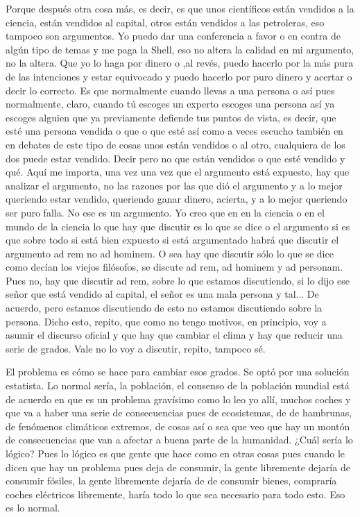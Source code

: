Porque después otra cosa más, es decir, es que unos científicos están vendidos a la ciencia, están vendidos al capital, otros están vendidos a las petroleras, eso tampoco son argumentos. Yo puedo dar una conferencia a favor o en contra de algún tipo de temas y me paga la Shell, eso no altera la calidad en mi argumento, no la altera. Que yo lo haga por dinero o ,al revés, puedo hacerlo por la más pura de las intenciones y estar equivocado y puedo hacerlo por puro dinero y acertar o decir lo correcto. Es que normalmente cuando llevas a una persona o así pues normalmente, claro, cuando tú escoges un experto escoges una persona así ya escoges alguien que ya previamente defiende tus puntos de vista, es decir, que esté una persona vendida o que o que esté así como a veces escucho también en en debates de este tipo de cosas unos están vendidos o al otro, cualquiera de los dos puede estar vendido. Decir pero no que están vendidos o que esté vendido y qué. Aquí me importa, una vez una vez que el argumento está expuesto, hay que analizar el argumento, no las razones por las que dió el argumento y a lo mejor queriendo estar vendido, queriendo ganar dinero, acierta, y a lo mejor queriendo ser puro falla. No ese es un argumento. Yo creo que en en la ciencia o en el mundo de la ciencia lo que hay que discutir es lo que se dice o el argumento si es que sobre todo si está bien expuesto si está argumentado habrá que discutir el argumento ad rem no ad hominem. O sea hay que discutir sólo lo que se dice como decían los viejos filósofos, se discute ad rem, ad hominem y ad personam. Pues no, hay que discutir ad rem, sobre lo que estamos discutiendo, si lo dijo ese señor que está vendido al capital, el señor es una mala persona y tal... De acuerdo, pero estamos discutiendo de esto no estamos discutiendo sobre la persona. Dicho esto, repito, que como no tengo motivos, en principio, voy a asumir el discurso oficial y que hay que cambiar el clima y hay que reducir una serie de grados. Vale no lo voy a discutir, repito, tampoco sé.

El problema es cómo se hace para cambiar esos grados. Se optó por una solución estatista. Lo normal sería, la población, el consenso de la población mundial está de acuerdo en que es un problema gravísimo como lo leo yo allí, muchos coches y que va a haber una serie de consecuencias pues de ecosistemas, de de hambrunas, de fenómenos climáticos extremos, de cosas así o sea que veo que hay un montón de consecuencias que van a afectar a buena parte de la humanidad. ¿Cuál sería lo lógico? Pues lo lógico es que gente que hace como en otras cosas pues cuando le dicen que hay un problema pues deja de consumir, la gente libremente dejaría de consumir fósiles, la gente libremente dejaría de de consumir bienes, compraría coches eléctricos libremente, haría todo lo que sea necesario para todo esto. Eso es lo normal.

